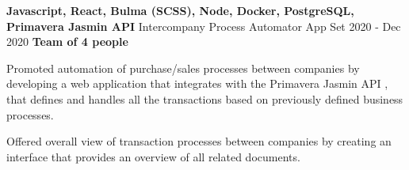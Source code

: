 \cventry
  {\textbf{Javascript, React, Bulma (SCSS), Node, Docker, PostgreSQL, Primavera Jasmin API}}
  {Intercompany Process Automator App \href{https://github.com/EduRibeiro00/CimbaIntercompany-feup-sinf}{\faExternalLink}} %
  {Set 2020 - Dec 2020}
  {\textbf{Team of 4 people}}
  {
    \begin{cvitems} %
      \item {Promoted automation of purchase/sales processes between companies by developing a web application that integrates with the Primavera Jasmin API \href{https://www.jasminsoftware.pt/}{\faExternalLink}, that defines and handles all the transactions based on previously defined business processes.}
      \item {Offered overall view of transaction processes between companies by creating an interface that provides an overview of all related documents.}
    \end{cvitems}
  }
